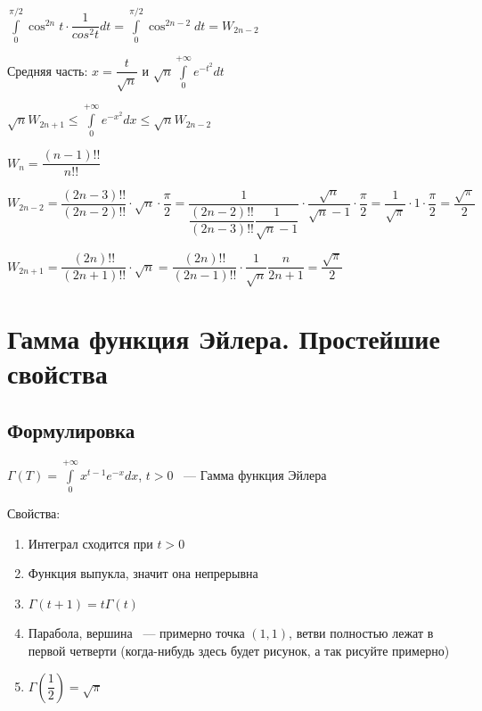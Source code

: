 \documentclass{article}
\begin{document}
            $\int\limits^{\pi / 2}_0 \cos^{2n} t \cdot \dfrac{1}{cos^2 t} dt = \int\limits^{\pi / 2}_0 \cos^{2n - 2} dt = W_{2n - 2}$
            
            Средняя часть: $x = \dfrac{t}{\sqrt{n}}$ и $\sqrt{n} \int\limits^{+\infty}_0 e^{-t^2} dt$
            
            $\sqrt{n} W_{2n + 1} \leq \int\limits^{+\infty}_0 e^{-x^2} dx \leq \sqrt{n} W_{2n - 2}$
            
            $W_n = \dfrac{(n - 1)!!}{n!!}$
            
            $W_{2n - 2} = \dfrac{(2n - 3)!!}{(2n - 2)!!} \cdot \sqrt{n} \cdot \dfrac{\pi}{2} = \dfrac{1}{\dfrac{(2n - 2)!!}{(2n - 3)!!} \dfrac{1}{\sqrt{n} - 1}} \cdot \dfrac{\sqrt{n}}{\sqrt{n} - 1} \cdot \dfrac{\pi}{2} = \dfrac{1}{\sqrt{\pi}} \cdot 1 \cdot \dfrac{\pi}{2} = \dfrac{\sqrt{\pi}}{2}$
            
            $W_{2n + 1} = \dfrac{(2n)!!}{(2n + 1)!!} \cdot \sqrt{n} = \dfrac{(2n)!!}{(2n - 1)!!} \cdot \dfrac{1}{\sqrt{n}} \dfrac{n}{2n + 1} = \dfrac{\sqrt{\pi}}{2}$
            
            
    \newpage
    
    \section{Гамма функция Эйлера. Простейшие свойства}
    
        \subsection{Формулировка}
        
            $\Gamma(T) = \int\limits^{+\infty}_0 x^{t - 1} e^{-x} dx$, $t > 0$ ~--- Гамма функция Эйлера
            
            Свойства:
            
            \begin{enumerate}
            
                \item Интеграл сходится при $t > 0$
                
                \item Функция выпукла, значит она непрерывна
                
                \item $\Gamma(t + 1) = t \Gamma (t)$
                
                \item Парабола, вершина ~--- примерно точка $(1, 1)$, ветви полностью лежат в первой четверти (когда-нибудь здесь будет рисунок, а так рисуйте примерно)
                
                \item $\Gamma \left( \dfrac{1}{2} \right) = \sqrt{\pi}$
                
            \end{enumerate}
            
\end{document}
